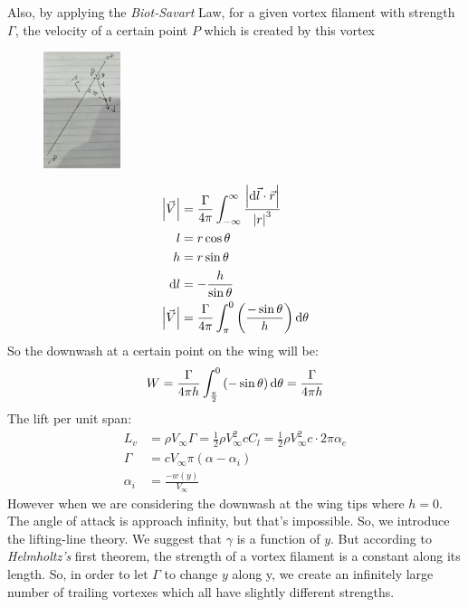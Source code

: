 \documentclass[11pt]{article}
\numberwithin{equation}{section}
\begin{document}
Also, by applying the \textit{Biot-Savart} Law,  for a given vortex filament with strength $\Gamma$, the velocity of a certain point $P$ which is created by this vortex
\begin{figure}[H]
  \centering
  \includegraphics[width=0.2\textwidth]{./img/diagram5.png}
  \caption{}
\end{figure}
\begin{align}
  \left| \vec{V} \right| &= \frac{\Gamma}{4\pi} \int_{-\infty}^{\infty} \frac{\left| \dif \vec{l} \cdot \vec{r} \right| }{ \left| r \right|^3}\\
  l &= r\cos{\theta}\\
  h &= r\sin{\theta}\\
  \dif l &= -\frac{h}{\sin{\theta}}\\
  \left| \vec{V} \right| &= \frac{\Gamma}{4\pi} \int_{\pi}^0 \left(\frac{-\sin{\theta}}{h}\right) \dif \theta\\
\end{align}
So the downwash at a certain point on the wing will be:
\begin{align}
  W = \frac{\Gamma}{4\pi h} \int_{\frac{\pi}{2}}^0\left(-\sin{\theta}\right)\dif \theta = \frac{\Gamma}{4\pi h}
\end{align}
The lift per unit span:
\begin{align}
  L_v &= \rho V_{\infty} \Gamma = \frac{1}{2}\rho V_{\infty}^2 c C_l = \frac{1}{2} \rho V_{\infty}^2 c \cdot 2\pi \alpha_e\\
  \Gamma &= cV_{\infty}\pi \left(\alpha - \alpha_i\right)\\
  \alpha_i &= \frac{-w\left(y\right)}{V_{\infty}}
\end{align}
However when we are considering the downwash at the wing tips where $h=0$. The angle of attack is approach infinity, but that's impossible. So, we introduce the lifting-line theory. We suggest that $\gamma$ is a function of $y$. But according to \textit{Helmholtz's} first theorem, the strength of a vortex filament is a constant along its length. So, in order to let $\Gamma$ to change $y$ along y, we create an infinitely large number of trailing vortexes which all have slightly different strengths.
\end{document}
